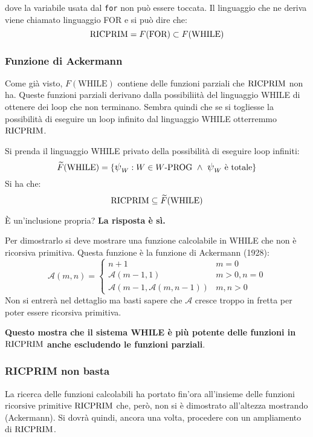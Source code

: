 dove la variabile usata dal \texttt{for} non può essere toccata. Il linguaggio che ne deriva
viene chiamato linguaggio FOR e si può dire che:
$$ \text{RICPRIM} = F(\text{FOR}) \subset F(\text{WHILE}) $$

\subsubsection{Funzione di Ackermann}
Come già visto, $F(\text{WHILE})$ contiene delle funzioni parziali che $\text{RICPRIM}$ non ha.
Queste funzioni parziali derivano dalla possibiliità del linguaggio WHILE di ottenere dei
loop che non terminano. Sembra quindi che se si togliesse la possibilità di eseguire un loop
infinito dal linguaggio WHILE otterremmo $\text{RICPRIM}$.

Si prenda il linguaggio WHILE privato della possibilità di eseguire loop infiniti:
$$ \widetilde{F}(\text{WHILE}) = 
    \{\semWHILE_W:W\in W\text{-PROG}\ \wedge\ \semWHILE_W\text{ è totale}\} $$
Si ha che:
$$ \text{RICPRIM}\subseteq\widetilde{F}(\text{WHILE}) $$

È un'inclusione propria? \textbf{La risposta è sì.}

Per dimostrarlo si deve mostrare una funzione calcolabile in WHILE che non è ricorsiva primitiva.
Questa funzione è la funzione di Ackermann (1928):
$$ \mathscr{A}(m,n) = \begin{cases}
    n+1 & m=0\\
    \mathscr{A}(m-1,1) & m>0,n=0\\
    \mathscr{A}(m-1,\mathscr{A}(m,n-1)) & m,n>0
\end{cases} $$
Non si entrerà nel dettaglio ma basti sapere che $\mathscr{A}$ cresce troppo in fretta per poter
essere ricorsiva primitiva.

\textbf{Questo mostra che il sistema WHILE è più potente delle funzioni in $\text{RICPRIM}$ anche
escludendo le funzioni parziali}.

\subsubsection{RICPRIM non basta}
La ricerca delle funzioni calcolabili ha portato fin'ora all'insieme delle funzioni ricorsive
primitive $\text{RICPRIM}$ che, però, non si è dimostrato all'altezza mostrando 
(Ackermann). Si dovrà quindi, ancora una volta, procedere con un ampliamento di $\text{RICPRIM}$.

\begin{center}
    
\end{center}
\vspace{1em}

